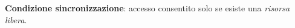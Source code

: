 \textbf{Condizione sincronizzazione}: accesso consentito solo se esiste una \textit{risorsa libera}.









































































